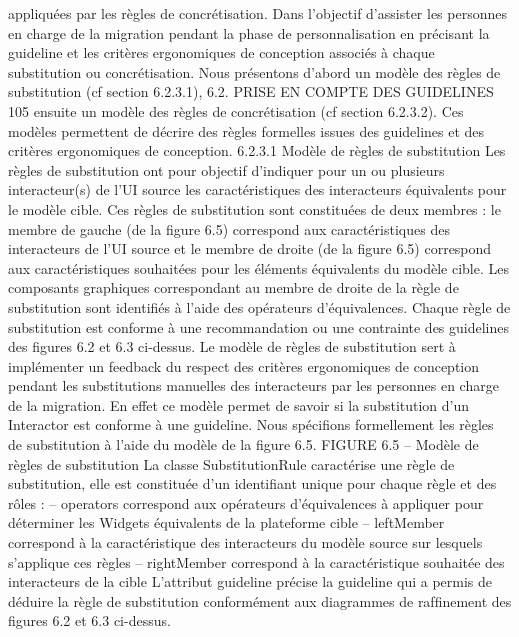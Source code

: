 \documentclass{article}
\begin{document}
appliqu\'{e}es par les r\`{e}gles de concr\'{e}tisation.
Dans l’objectif d’assister les personnes en charge de la migration pendant la phase de personnalisation en pr\'{e}cisant la guideline et les crit\`{e}res ergonomiques de conception associ\'{e}s \`{a} chaque substitution
ou concr\'{e}tisation. Nous pr\'{e}sentons d’abord un mod\`{e}le des r\`{e}gles de substitution (cf section 6.2.3.1),
6.2. PRISE EN COMPTE DES GUIDELINES
105
ensuite un mod\`{e}le des r\`{e}gles de concr\'{e}tisation (cf section 6.2.3.2). Ces mod\`{e}les permettent de d\'{e}crire
des r\`{e}gles formelles issues des guidelines et des crit\`{e}res ergonomiques de conception.
6.2.3.1
Mod\`{e}le de r\`{e}gles de substitution
Les r\`{e}gles de substitution ont pour objectif d’indiquer pour un ou plusieurs interacteur(s) de l’UI
source les caract\'{e}ristiques des interacteurs \'{e}quivalents pour le mod\`{e}le cible. Ces r\`{e}gles de substitution sont constitu\'{e}es de deux membres : le membre de gauche (de la ﬁgure 6.5) correspond aux
caract\'{e}ristiques des interacteurs de l’UI source et le membre de droite (de la ﬁgure 6.5) correspond
aux caract\'{e}ristiques souhait\'{e}es pour les \'{e}l\'{e}ments \'{e}quivalents du mod\`{e}le cible. Les composants graphiques correspondant au membre de droite de la r\`{e}gle de substitution sont identiﬁ\'{e}s \`{a} l’aide des
op\'{e}rateurs d’\'{e}quivalences.
Chaque r\`{e}gle de substitution est conforme \`{a} une recommandation ou une contrainte des guidelines
des ﬁgures 6.2 et 6.3 ci-dessus.
Le mod\`{e}le de r\`{e}gles de substitution sert \`{a} impl\'{e}menter un feedback du respect des crit\`{e}res ergonomiques de conception pendant les substitutions manuelles des interacteurs par les personnes en charge
de la migration. En effet ce mod\`{e}le permet de savoir si la substitution d’un Interactor est conforme \`{a}
une guideline.
Nous sp\'{e}ciﬁons formellement les r\`{e}gles de substitution \`{a} l’aide du mod\`{e}le de la ﬁgure 6.5.
FIGURE 6.5 – Mod\`{e}le de r\`{e}gles de substitution
La classe SubstitutionRule
caract\'{e}rise une r\`{e}gle de substitution, elle est constitu\'{e}e d’un identiﬁant
unique pour chaque r\`{e}gle et des r\^{o}les :
– operators correspond aux op\'{e}rateurs d’\'{e}quivalences \`{a} appliquer pour d\'{e}terminer les Widgets
\'{e}quivalents de la plateforme cible
– leftMember correspond \`{a} la caract\'{e}ristique des interacteurs du mod\`{e}le source sur lesquels s’applique ces r\`{e}gles
– rightMember correspond \`{a} la caract\'{e}ristique souhait\'{e}e des interacteurs de la cible
L’attribut guideline pr\'{e}cise la guideline qui a permis de d\'{e}duire la r\`{e}gle de substitution conform\'{e}ment aux diagrammes de rafﬁnement des ﬁgures 6.2 et 6.3 ci-dessus.
\end{document}
